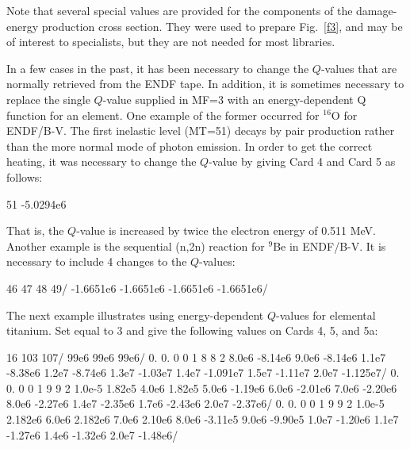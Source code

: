 Note that several special  values are provided for
the components of the damage-energy production cross section.
They were used to prepare Fig.~\ref{f3}, and may be of interest
to specialists, but they are not needed for most libraries.

In a few cases in the past, it has been necessary to change
the $Q$-values that are normally retrieved from the ENDF tape.
In addition, it is sometimes necessary to replace the single
$Q$-value supplied in MF=3 with an energy-dependent Q function
for an element.  One example of the former occurred for $^{16}$O
for ENDF/B-V.  The first inelastic level (MT=51) decays by
pair production rather than the more normal mode of photon
emission.  In order to get the correct heating, it was necessary
to change the $Q$-value by giving Card 4 and Card 5 as follows:

\small
\begin{ccode}

   51
   -5.0294e6

\end{ccode}
\normalsize

\noindent
That is, the $Q$-value is increased by twice the electron energy
of 0.511 MeV.  Another example is the sequential (n,2n)
reaction for $^{9}$Be in ENDF/B-V.  It is necessary to include
4 changes to the $Q$-values:

\small
\begin{ccode}

   46 47 48 49/
   -1.6651e6 -1.6651e6 -1.6651e6 -1.6651e6/

\end{ccode}
\normalsize

\noindent
The next example illustrates using energy-dependent $Q$-values
 for elemental titanium.  Set
 equal to 3 and give the following values on
Cards 4, 5, and 5a:

\small
\begin{ccode}

   16 103 107/
   99e6 99e6 99e6/
   0. 0. 0 0 1 8
   8 2
   8.0e6 -8.14e6 9.0e6 -8.14e6 1.1e7 -8.38e6
   1.2e7 -8.74e6 1.3e7 -1.03e7 1.4e7 -1.091e7
   1.5e7 -1.11e7 2.0e7 -1.125e7/
   0. 0. 0 0 1 9
   9 2
   1.0e-5 1.82e5 4.0e6 1.82e5 5.0e6 -1.19e6
   6.0e6 -2.01e6 7.0e6 -2.20e6 8.0e6 -2.27e6
   1.4e7 -2.35e6 1.7e6 -2.43e6 2.0e7 -2.37e6/
   0. 0. 0 0 1 9
   9 2
   1.0e-5 2.182e6 6.0e6 2.182e6 7.0e6 2.10e6
   8.0e6 -3.11e5 9.0e6 -9.90e5 1.0e7 -1.20e6
   1.1e7 -1.27e6 1.4e6 -1.32e6 2.0e7 -1.48e6/

\end{ccode}
\normalsize

